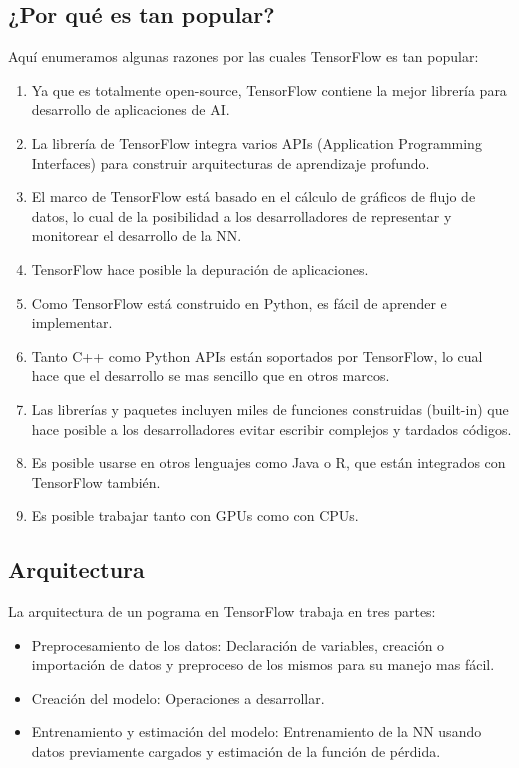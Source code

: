 \documentclass{article}
\begin{document}
\subsection{¿Por qué es tan popular?}
Aquí enumeramos algunas razones por las cuales TensorFlow es tan popular:
\begin{enumerate}
    \item Ya que es totalmente open-source, TensorFlow contiene la mejor librería para desarrollo de aplicaciones de AI.
    \item La librería de TensorFlow integra varios APIs (Application Programming Interfaces) para construir arquitecturas de aprendizaje profundo.
    \item El marco de TensorFlow está basado en el cálculo de gráficos de flujo de datos, lo cual de la posibilidad a los desarrolladores de representar y monitorear el desarrollo de la NN.
    \item TensorFlow hace posible la depuración de aplicaciones.
    \item Como TensorFlow está construido en Python, es fácil de aprender e implementar.
    \item Tanto C++ como Python APIs están soportados por TensorFlow, lo cual hace que el desarrollo se mas sencillo que en otros marcos.
    \item Las librerías y paquetes incluyen miles de funciones construidas (built-in) que hace posible a los desarrolladores evitar escribir complejos y tardados códigos.
    \item Es posible usarse en otros lenguajes como Java o R, que están integrados con TensorFlow también.
    \item Es posible trabajar tanto con GPUs como con CPUs.
\end{enumerate}

\subsection{Arquitectura}
La arquitectura de un pograma en TensorFlow trabaja en tres partes:
\begin{itemize}
    \item Preprocesamiento de los datos: Declaración de variables, creación o importación de datos y preproceso de los mismos para su manejo mas fácil.
    \item Creación del modelo: Operaciones a desarrollar.
    \item Entrenamiento y estimación del modelo: Entrenamiento de la NN usando datos previamente cargados y estimación de la función de pérdida.
\end{itemize}
\end{document}

